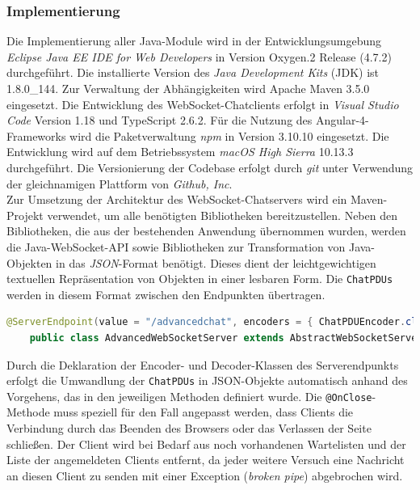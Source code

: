 \documentclass[11pt,a4paper,titlepage]{scrartcl}
\numberwithin{equation}{section}
\begin{document}
\subsubsection{Implementierung}
Die Implementierung aller Java-Module wird in der Entwicklungsumgebung \textit{Eclipse Java EE IDE for Web Developers} in Version Oxygen.2 Release (4.7.2) durchgeführt. Die installierte Version des \textit{Java Development Kits} (JDK) ist 1.8.0\_144. Zur Verwaltung der Abhängigkeiten wird Apache Maven 3.5.0 eingesetzt. Die Entwicklung des WebSocket-Chatclients erfolgt in \textit{Visual Studio Code} Version 1.18 und TypeScript 2.6.2. Für die Nutzung des Angular-4-Frameworks wird die Paketverwaltung \textit{npm} in Version 3.10.10 eingesetzt. Die Entwicklung wird auf dem Betriebssystem \textit{macOS High Sierra} 10.13.3 durchgeführt. Die Versionierung der Codebase erfolgt durch \textit{git} unter Verwendung der gleichnamigen Plattform von \textit{Github, Inc}. \\

\noindent Zur Umsetzung der Architektur des WebSocket-Chatservers wird ein Maven-Projekt verwendet, um alle benötigten Bibliotheken bereitzustellen. Neben den Bibliotheken, die aus der bestehenden Anwendung übernommen wurden, werden die Java-WebSocket-API sowie Bibliotheken zur Transformation von Java-Objekten in das \textit{JSON}-Format benötigt. Dieses dient der leichtgewichtigen textuellen Repräsentation von Objekten in einer lesbaren Form. Die \texttt{ChatPDUs} werden in diesem Format zwischen den Endpunkten übertragen.
\newpage

\begin{lstlisting}[frame=single, language=Java, caption=AdvancedWebSocketServer-Annotation,label=lst:wsServerImpl]
	@ServerEndpoint(value = "/advancedchat", encoders = { ChatPDUEncoder.class }, decoders = { ChatPDUDecoder.class })
	public class AdvancedWebSocketServer extends AbstractWebSocketServer { ... }
\end{lstlisting}

\noindent Durch die Deklaration der Encoder- und Decoder-Klassen des Serverendpunkts erfolgt die Umwandlung der \texttt{ChatPDUs} in JSON-Objekte automatisch anhand des Vorgehens, das in den jeweiligen Methoden definiert wurde. Die \texttt{@OnClose}-Methode muss speziell für den Fall angepasst werden, dass Clients die Verbindung durch das Beenden des Browsers oder das Verlassen der Seite schließen. Der Client wird bei Bedarf aus noch vorhandenen Wartelisten und der Liste der angemeldeten Clients entfernt, da jeder weitere Versuch eine Nachricht an diesen Client zu senden mit einer Exception (\textit{broken pipe}) abgebrochen wird.\medskip
\end{document}
